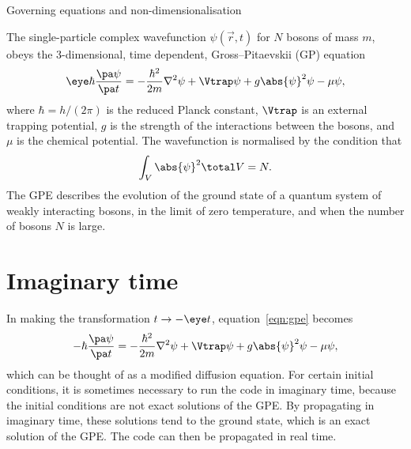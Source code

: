 %
%
%

\begin{chapter}{\label{cha:equations}Governing equations and
  non-dimensionalisation}

  The single-particle complex wavefunction $\psi(\vec{r}, t)$ for $N$ bosons of
  mass $m$, obeys the 3-dimensional, time dependent, Gross--Pitaevskii (GP)
  equation \citep{Gross61,Pitaevskii61}
  \begin{equation}
    \eye \hbar \frac{\pa \psi}{\pa t} = -\frac{\hbar^{2}}{2m} \nabla^{2} \psi +
    \Vtrap \psi + g \abs{\psi}^{2} \psi - \mu \psi,
    \label{eqn:gpe}
  \end{equation}
  where $\hbar = h/(2\pi)$ is the reduced Planck constant, $\Vtrap$ is an
  external trapping potential, $g$ is the strength of the interactions between
  the bosons, and $\mu$ is the chemical potential.  The wavefunction is
  normalised by the condition that
  \begin{equation*}
    \int_{V}{\abs{\psi}^{2}}\total V = N.
  \end{equation*}
  The GPE describes the evolution of the ground state of a quantum system of
  weakly interacting bosons, in the limit of zero temperature, and when the
  number of bosons $N$ is large.

  \section{Imaginary time}
  In making the transformation $t \to -\eye t$, equation~\eqref{eqn:gpe}
  becomes
  \begin{equation*}
    -\hbar \frac{\pa \psi}{\pa t} = -\frac{\hbar^{2}}{2m} \nabla^{2} \psi +
    \Vtrap \psi + g \abs{\psi}^{2} \psi - \mu \psi,
  \end{equation*}
  which can be thought of as a modified diffusion equation.  For certain
  initial conditions, it is sometimes necessary to run the code in imaginary
  time, because the initial conditions are not exact solutions of the GPE.  By
  propagating in imaginary time, these solutions tend to the ground state,
  which is an exact solution of the GPE.  The code can then be propagated in
  real time.


\end{chapter}
